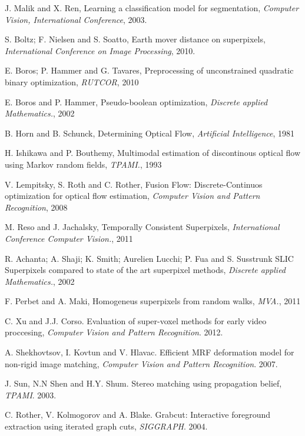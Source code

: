 \begin{thebibliography}{99}

J. Malik and X. Ren, Learning a classification model for segmentation, {\it Computer Vision, International Conference}, 2003.

S. Boltz; F. Nielsen and S. Soatto, Earth mover distance on superpixels, {\it International Conference on Image Processing}, 2010.

E. Boros; P. Hammer and G. Tavares, Preprocessing of unconstrained quadratic binary optimization, {\it RUTCOR}, 2010

E. Boros and P. Hammer, Pseudo-boolean optimization, {\it Discrete applied Mathematics.}, 2002

B. Horn and B. Schunck, Determining Optical Flow, {\it Artificial Intelligence}, 1981

H. Ishikawa and P. Bouthemy, Multimodal estimation of discontinous optical flow using Markov random fields, {\it TPAMI.}, 1993

V. Lempitsky, S. Roth and C. Rother, Fusion Flow: Discrete-Continuos optimization for optical flow estimation, {\it Computer Vision and Pattern Recognition}, 2008

M. Reso and J. Jachalsky, Temporally Consistent Superpixels, {\it International Conference Computer Vision.}, 2011

R. Achanta; A. Shaji; K. Smith; Aurelien Lucchi; P. Fua and S. Susstrunk SLIC Superpixels compared to state of the art superpixel methods, {\it Discrete applied Mathematics.}, 2002

F. Perbet and A. Maki, Homogeneus superpixels from random walks, {\it MVA.}, 2011

C. Xu and J.J. Corso. Evaluation of super-voxel methods for early video proccesing, {\it Computer Vision and Pattern Recognition}. 2012.

A. Shekhovtsov, I. Kovtun and V. Hlavac. Efficient MRF deformation model for non-rigid image matching, {\it Computer Vision and Pattern Recognition}. 2007.

J. Sun, N.N Shen and H.Y. Shum. Stereo matching using propagation belief, {\it TPAMI}. 2003.

C. Rother, V. Kolmogorov and A. Blake. Grabcut: Interactive foreground extraction using iterated graph cuts, {\it SIGGRAPH}. 2004.


\end{thebibliography}
